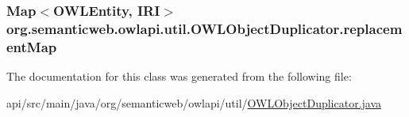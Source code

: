\hypertarget{classorg_1_1semanticweb_1_1owlapi_1_1util_1_1_o_w_l_object_duplicator_aaa2edefd8202c687e1e1427a57dfa908}{
\subsubsection[{replacement\-Map}]{\setlength{\rightskip}{0pt plus 5cm}Map$<${\bf O\-W\-L\-Entity}, {\bf I\-R\-I}$>$ org.\-semanticweb.\-owlapi.\-util.\-O\-W\-L\-Object\-Duplicator.\-replacement\-Map\hspace{0.3cm}{\ttfamily [private]}}}\label{classorg_1_1semanticweb_1_1owlapi_1_1util_1_1_o_w_l_object_duplicator_aaa2edefd8202c687e1e1427a57dfa908}


The documentation for this class was generated from the following file\-:\begin{DoxyCompactItemize}
\item 
api/src/main/java/org/semanticweb/owlapi/util/\hyperlink{_o_w_l_object_duplicator_8java}{O\-W\-L\-Object\-Duplicator.\-java}\end{DoxyCompactItemize}
